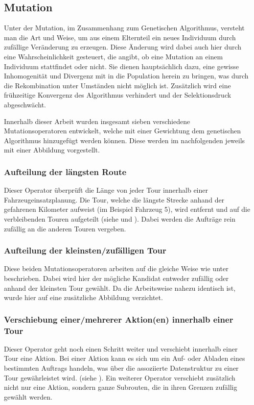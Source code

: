 \subsection{Mutation}
Unter der Mutation, im Zusammenhang zum Genetischen Algorithmus, versteht man die Art und Weise, um aus einem Elternteil ein neues Individuum durch zufällige Veränderung zu erzeugen. Diese Änderung wird dabei auch hier durch eine Wahrscheinlichkeit gesteuert, die angibt, ob eine Mutation an einem Individuum stattfindet oder nicht. Sie dienen hauptsächlich dazu, eine gewisse Inhomogenität und Divergenz mit in die Population herein zu bringen, was durch die Rekombination unter Umständen nicht möglich ist. Zusätzlich wird eine frühzeitige Konvergenz des Algorithmus verhindert und der Selektionsdruck abgeschwächt. 

Innerhalb dieser Arbeit wurden insgesamt sieben verschiedene Mutationsoperatoren entwickelt, welche mit einer Gewichtung dem genetischen Algorithmus hinzugefügt werden können. Diese werden im nachfolgenden jeweils mit einer Abbildung vorgestellt.

\subsubsection{Aufteilung der längsten Route}
\label{sec:AufteilungLangaesteRoute}
Dieser Operator überprüft die Länge von jeder Tour innerhalb einer Fahrzeugeinsatzplanung. Die Tour, welche die längste Strecke anhand der gefahrenen Kilometer aufweist (im Beispiel Fahrzeug 5), wird entfernt und auf die verbleibenden Touren aufgeteilt (siehe  und ). Dabei werden die Aufträge rein zufällig an die anderen Touren vergeben.


\subsubsection{Aufteilung der kleinsten/zufälligen Tour}
Diese beiden Mutationsoperatoren arbeiten auf die gleiche Weise wie unter  beschrieben. Dabei wird hier der mögliche Kandidat entweder zufällig oder anhand der kleinsten Tour gewählt. Da die Arbeitsweise nahezu identisch ist, wurde hier auf eine zusätzliche Abbildung verzichtet.

\subsubsection{Verschiebung einer/mehrerer Aktion(en) innerhalb einer Tour}
Dieser Operator geht noch einen Schritt weiter und verschiebt innerhalb einer Tour eine Aktion. Bei einer Aktion kann es sich um ein Auf- oder Abladen eines bestimmten Auftrags handeln, was über die assoziierte Datenstruktur zu einer Tour gewährleistet wird. (siehe ). Ein weiterer Operator verschiebt zusätzlich nicht nur eine Aktion, sondern ganze Subrouten, die in ihren Grenzen zufällig gewählt werden.

